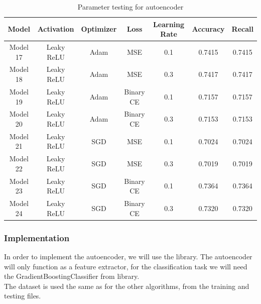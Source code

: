 \begin{table}[H]
    \centering
    \begin{tabularx}{\textwidth}{|c|c|c|c|c|c|c|}
        \hline
        \textbf{Model} & \textbf{Activation} & \textbf{Optimizer} & \textbf{Loss} & \textbf{Learning Rate} & \textbf{Accuracy} & \textbf{Recall} \\
        \hline
        Model 17 & Leaky ReLU & Adam & MSE & 0.1 & 0.7415 & 0.7415 \\
        \hline
        Model 18 & Leaky ReLU & Adam & MSE & 0.3 & 0.7417 & 0.7417 \\
        \hline
        Model 19 & Leaky ReLU & Adam & Binary CE & 0.1 & 0.7157 & 0.7157 \\
        \hline
        Model 20 & Leaky ReLU & Adam & Binary CE & 0.3 & 0.7153 & 0.7153 \\
        \hline
        Model 21 & Leaky ReLU & SGD & MSE & 0.1 & 0.7024 & 0.7024 \\
        \hline
        Model 22 & Leaky ReLU & SGD & MSE & 0.3 & 0.7019 & 0.7019 \\
        \hline
        Model 23 & Leaky ReLU & SGD & Binary CE & 0.1 & 0.7364 & 0.7364 \\
        \hline
        Model 24 & Leaky ReLU & SGD & Binary CE & 0.3 & 0.7320 & 0.7320 \\
        \hline
    \end{tabularx}
    \caption{Parameter testing for autoencoder}
    \label{tab:op4}
\end{table}





\subsubsection{Implementation}
In order to implement the autoencoder, we will use the  library. The autoencoder will only function as a feature extractor, for the classification task we will need the {GradientBoostingClassifier} from  library.\\

\noindent The dataset is used the same as for the other algorithms, from the training and testing files.

\vspace{0.5cm}

\vspace{0.5cm}

